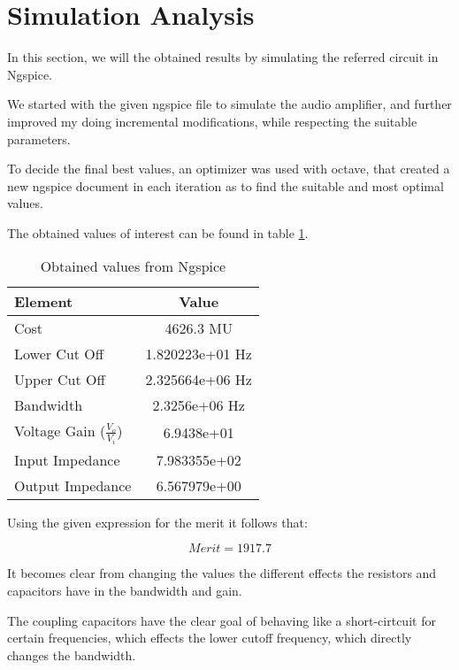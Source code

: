 \newpage

\section{Simulation Analysis}
\label{sec:simulation}

In this section, we will the obtained results by simulating the referred circuit in Ngspice. 

We started with the given ngspice file to simulate the audio amplifier, and further improved my doing incremental modifications, while respecting the suitable parameters.

To decide the final best values, an optimizer was used with octave, that created a new ngspice document in each iteration as to find the suitable and most optimal values.

The obtained values of interest can be found in table \ref{tab:sim1}.

\begin{table}[h]
    \centering
    \begin{tabular}{|l|c|}
    \hline
    {\bf Element } & {\bf Value} \\
    \hline \hline
    Cost & 4626.3 MU\\
    \hline
    Lower Cut Off & 1.820223e+01 Hz\\
    \hline
    Upper Cut Off & 2.325664e+06 Hz \\
    \hline
    Bandwidth & 2.3256e+06 Hz \\
    \hline
    Voltage Gain ($\frac{V_{o}}{V_{i}}$)  &  6.9438e+01 \\
    \hline
    Input Impedance & 7.983355e+02 \\
    \hline
    Output Impedance & 6.567979e+00 \\
    \hline 
    \end{tabular}
    \caption{Obtained values from Ngspice}
    \label{tab:sim1}
\end{table}


Using the given expression for the merit it follows that:

\begin{equation}
    Merit = 1917.7 
    \label{eq:merit}
\end{equation}

It becomes clear from changing the values the different effects the resistors and capacitors have in the bandwidth and gain.

The coupling capacitors have the clear goal of behaving like a short-cirtcuit for certain frequencies, which effects the lower cutoff frequency, which directly changes the bandwidth.

